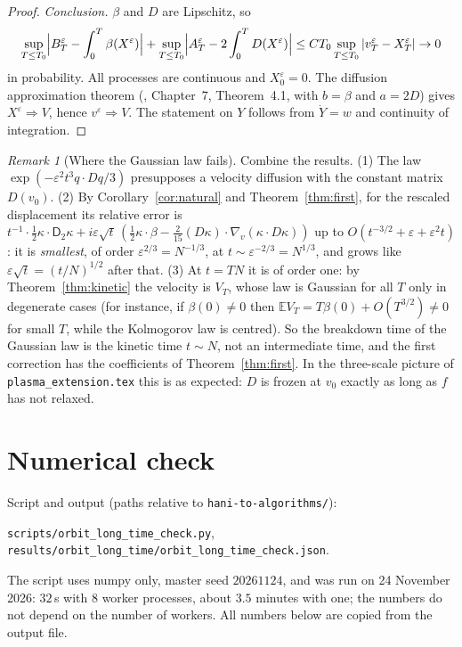 \documentclass[11pt]{article}
\newcommand{\E}{\mathbb{E}}
\newcommand{\eps}{\varepsilon}
\newcommand{\sD}{\mathsf{D}}
\theoremstyle{remark}
\newtheorem{remark}[theorem]{Remark}
\begin{document}
\begin{proof}
\emph{Conclusion.} $\beta$ and $D$ are Lipschitz, so
\[
  \sup_{T\le T_0}\Bigl|B^\eps_T - \int_0^T\beta(X^\eps)\Bigr|
  + \sup_{T\le T_0}\Bigl|A^\eps_T - 2\int_0^TD(X^\eps)\Bigr|
  \le CT_0\sup_{T\le T_0}|v^\eps_T-X^\eps_T|\to0
\]
in probability. All processes
are continuous and $X^\eps_0 = 0$. The diffusion approximation theorem
(\cite{EK}, Chapter~7, Theorem~4.1, with $b = \beta$ and $a = 2D$) gives
$X^\eps\Rightarrow V$, hence $v^\eps\Rightarrow V$. The statement on $Y$
follows from $\dot Y = w$ and continuity of integration.
\end{proof}

\begin{remark}[Where the Gaussian law fails]\label{rem:breakdown}
Combine the results. (1) The law
$\exp(-\eps^2t^3q\cdot Dq/3)$ presupposes a velocity diffusion with the
constant matrix $D(v_0)$. (2) By Corollary~\ref{cor:natural} and
Theorem~\ref{thm:first}, for the rescaled displacement its relative error is
$t^{-1}\cdot\frac12\kappa\cdot\sD_2\kappa
 + i\eps\sqrt t\,(\frac12\kappa\cdot\beta - \frac2{15}(D\kappa)\cdot\nabla_v(\kappa\cdot D\kappa))$
up to $O(t^{-3/2}+\eps+\eps^2t)$: it is \emph{smallest}, of order
$\eps^{2/3} = N^{-1/3}$, at $t\sim\eps^{-2/3} = N^{1/3}$, and grows like
$\eps\sqrt t = (t/N)^{1/2}$ after that. (3) At $t = TN$ it is of order one:
by Theorem~\ref{thm:kinetic} the velocity is $V_T$, whose law is Gaussian for
all $T$ only in degenerate cases (for instance, if $\beta(0)\ne0$ then
$\E V_T = T\beta(0) + O(T^{3/2})\ne0$ for small $T$, while the Kolmogorov law
is centred).
So the breakdown time of the Gaussian law is the kinetic time $t\sim N$, not
an intermediate time, and the first correction has the coefficients of
Theorem~\ref{thm:first}. In the three-scale picture of
\texttt{plasma\_extension.tex} this is as expected: $D$ is frozen at $v_0$
exactly as long as $f$ has not relaxed.
\end{remark}

\section{Numerical check}
\label{sec:num}

Script and output (paths relative to \texttt{hani-to-algorithms/}):
\begin{center}
\texttt{scripts/orbit\_long\_time\_check.py},\qquad
\texttt{results/orbit\_long\_time/orbit\_long\_time\_check.json}.
\end{center}
The script uses numpy only, master seed $20261124$, and was run on
24 November 2026: $32$\,s with 8 worker processes, about $3.5$ minutes with
one; the numbers do not depend on the number of workers. All numbers below
are copied from the output file.
\end{document}
